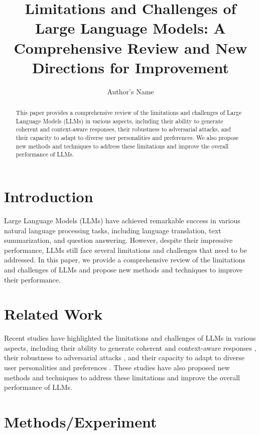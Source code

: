 \documentclass{article}
\begin{document}
\title{Limitations and Challenges of Large Language Models: A Comprehensive Review and New Directions for Improvement}

\author{Author's Name}

\maketitle

\begin{abstract}
This paper provides a comprehensive review of the limitations and challenges of Large Language Models (LLMs) in various aspects, including their ability to generate coherent and context-aware responses, their robustness to adversarial attacks, and their capacity to adapt to diverse user personalities and preferences. We also propose new methods and techniques to address these limitations and improve the overall performance of LLMs.
\end{abstract}

\section{Introduction}

Large Language Models (LLMs) have achieved remarkable success in various natural language processing tasks, including language translation, text summarization, and question answering. However, despite their impressive performance, LLMs still face several limitations and challenges that need to be addressed. In this paper, we provide a comprehensive review of the limitations and challenges of LLMs and propose new methods and techniques to improve their performance.

\section{Related Work}

Recent studies have highlighted the limitations and challenges of LLMs in various aspects, including their ability to generate coherent and context-aware responses \cite{lyngbaek2026sentimentbananashapedexploringgeometry}, their robustness to adversarial attacks \cite{wang2026llmdecisionsfaithfulverbal}, and their capacity to adapt to diverse user personalities and preferences \cite{rooein2026patspersonalityawareteachingstrategies}. These studies have also proposed new methods and techniques to address these limitations and improve the overall performance of LLMs.

\section{Methods/Experiment}
\end{document}
